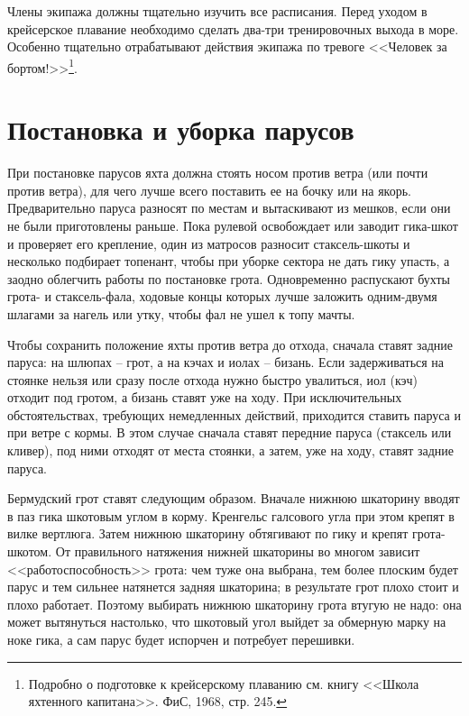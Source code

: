\documentclass[a4paper, 12pt, twoside, final]{scrbook}
\begin{document}
Члены экипажа должны тщательно изучить все расписания. Перед уходом в крейсерское плавание необходимо сделать два-три тренировочных выхода в море. Особенно тщательно отрабатывают действия экипажа по тревоге <<Человек за бортом!>>\footnote{Подробно о подготовке к крейсерскому плаванию см. книгу <<Школа яхтенного капитана>>. ФиС, 1968, стр. 245.}.

\section{Постановка и уборка парусов}

При постановке парусов яхта должна стоять носом против ветра (или почти против ветра), для чего лучше всего поставить ее на бочку или на якорь. Предварительно паруса разносят по местам и вытаскивают из мешков, если они не были приготовлены раньше. Пока рулевой освобождает или заводит гика-шкот и проверяет его крепление, один из матросов разносит стаксель-шкоты и несколько подбирает топенант, чтобы при уборке сектора не дать гику упасть, а заодно облегчить работы по постановке грота. Одновременно распускают бухты грота- и стаксель-фала, ходовые концы которых лучше заложить одним-двумя шлагами за нагель или утку, чтобы фал не ушел к топу мачты.

Чтобы сохранить положение яхты против ветра до отхода, сначала ставят задние паруса: на шлюпах \--- грот, а на кэчах и иолах \--- бизань. Если задерживаться на стоянке нельзя или сразу после отхода нужно быстро увалиться, иол (кэч) отходит под гротом, а бизань ставят уже на ходу. При исключительных обстоятельствах, требующих немедленных действий, приходится ставить паруса и при ветре с кормы. В этом случае сначала ставят передние паруса (стаксель или кливер), под ними отходят от места стоянки, а затем, уже на ходу, ставят задние паруса.

Бермудский грот ставят следующим образом. Вначале нижнюю шкаторину вводят в паз гика шкотовым углом в корму. Кренгельс галсового угла при этом крепят в вилке вертлюга. Затем нижнюю шкаторину обтягивают по гику и крепят грота-шкотом. От правильного натяжения нижней шкаторины во многом зависит <<работоспособность>> грота: чем туже она выбрана, тем более плоским будет парус и тем сильнее натянется задняя шкаторина; в результате грот плохо стоит и плохо работает. Поэтому выбирать нижнюю шкаторину грота втугую не надо: она может вытянуться настолько, что шкотовый угол выйдет за обмерную марку на ноке гика, а сам парус будет испорчен и потребует перешивки.
\end{document}

